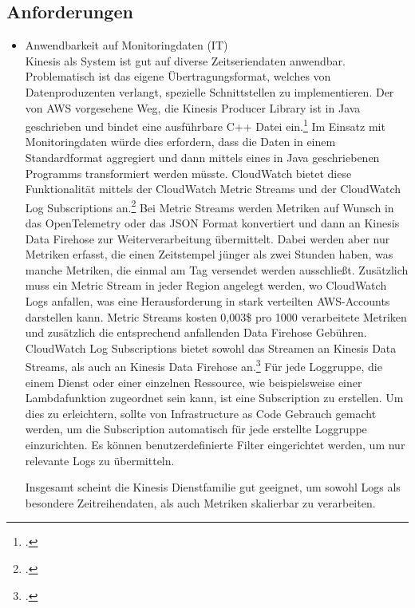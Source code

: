 \subsection{Anforderungen}
\begin{itemize}
\item Anwendbarkeit auf Monitoringdaten (IT)\\
Kinesis als System ist gut auf diverse Zeitseriendaten anwendbar. Problematisch ist das eigene Übertragungsformat, welches von Datenproduzenten verlangt, spezielle Schnittstellen zu implementieren. Der von \ac{AWS} vorgesehene Weg, die Kinesis Producer Library ist in Java geschrieben und bindet eine ausführbare C++ Datei ein.\footcite[Vgl.][]{AmazonWebServicesInc..o.J.bg} Im Einsatz mit Monitoringdaten würde dies erfordern, dass die Daten in einem Standardformat aggregiert und dann mittels eines in Java geschriebenen Programms transformiert werden müsste. 
CloudWatch bietet diese Funktionalität mittels der CloudWatch Metric Streams und der CloudWatch Log Subscriptions an.\footcite[Vgl. auch im Folgenden][]{Barr.2021} Bei Metric Streams werden Metriken auf Wunsch in das OpenTelemetry oder das \ac{JSON} Format konvertiert und dann an Kinesis Data Firehose zur Weiterverarbeitung übermittelt. Dabei werden aber nur Metriken erfasst, die einen Zeitstempel jünger als zwei Stunden haben, was manche Metriken, die einmal am Tag versendet werden ausschließt. Zusätzlich muss ein Metric Stream in jeder Region angelegt werden, wo CloudWatch Logs anfallen, was eine Herausforderung in stark verteilten \ac{AWS}-Accounts darstellen kann. Metric Streams kosten 0,003\$ pro 1000 verarbeitete Metriken und zusätzlich die entsprechend anfallenden Data Firehose Gebühren. CloudWatch Log Subscriptions bietet sowohl das Streamen an Kinesis Data Streams, als auch an Kinesis Data Firehose an.\footcite[Vgl. auch im Folgenden][]{AmazonWebServicesInc..o.J.bk} Für jede Loggruppe, die einem Dienst oder einer einzelnen Ressource, wie beispielsweise einer Lambdafunktion zugeordnet sein kann, ist eine Subscription zu erstellen. Um dies zu erleichtern, sollte von Infrastructure as Code Gebrauch gemacht werden, um die Subscription automatisch für jede erstellte Loggruppe einzurichten. Es können benutzerdefinierte Filter eingerichtet werden, um nur relevante Logs zu übermitteln.

Insgesamt scheint die Kinesis Dienstfamilie gut geeignet, um sowohl Logs als besondere Zeitreihendaten, als auch Metriken skalierbar zu verarbeiten.


\end{itemize}
